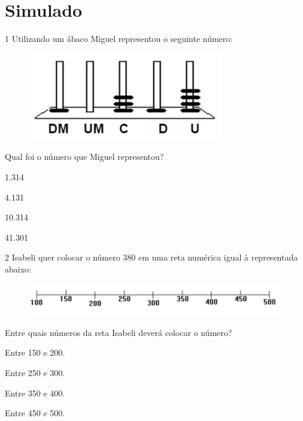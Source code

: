 \setcounter{chapter}{0}
\chapter[Simulado 2]{Simulado}

\num{1} Utilizando um ábaco Miguel representou o seguinte número:


\begin{figure}[htpb!]
\includegraphics[width=.5\textwidth]{./imgs/mat20.png}
\end{figure}

Qual foi o número que Miguel representou?

\begin{minipage}{.5\textwidth}
\begin{escolha}
\item
  1.314
\item
  4.131
\item
  10.314
\item
  41.301
\end{escolha}
\end{minipage}


\num{2} Isabeli quer colocar o número 380 em uma reta numérica igual à
representada abaixo:

\begin{figure}[htpb!]
\includegraphics[width=\textwidth]{./imgs/mat21.png}
\end{figure}

Entre quais números da reta Isabeli deverá colocar o
número?

\begin{escolha}
\item
  Entre 150 e 200.
\item
  Entre 250 e 300.
\item
  Entre 350 e 400.
\item
  Entre 450 e 500. 
\end{escolha}


